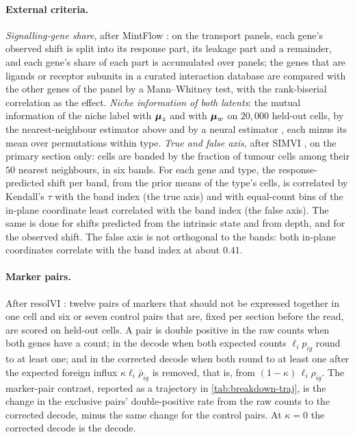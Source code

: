 \paragraph{External criteria.} \emph{Signalling-gene share}, after MintFlow \citep{akbarnejad2025mintflow}: on the transport panels, each gene's observed shift is split into its response part, its leakage part and a remainder, and each gene's share of each part is accumulated over panels; the genes that are ligands or receptor subunits in a curated interaction database \citep{jin2025cellchat} are compared with the other genes of the panel by a Mann--Whitney test, with the rank-biserial correlation as the effect. \emph{Niche information of both latents}: the mutual information of the niche label with $\boldsymbol{\mu}_z$ and with $\boldsymbol{\mu}_w$ on $20{,}000$ held-out cells, by the nearest-neighbour estimator above and by a neural estimator \citep{belghazi2018}, each minus its mean over permutations within type. \emph{True and false axis}, after SIMVI \citep{dong2025simvi}, on the primary section only: cells are banded by the fraction of tumour cells among their $50$ nearest neighbours, in six bands. For each gene and type, the response-predicted shift per band, from the prior means of the type's cells, is correlated by Kendall's $\tau$ with the band index (the true axis) and with equal-count bins of the in-plane coordinate least correlated with the band index (the false axis). The same is done for shifts predicted from the intrinsic state and from depth, and for the observed shift. The false axis is not orthogonal to the bands: both in-plane coordinates correlate with the band index at about $0.41$.

\paragraph{Marker pairs.} After resolVI \citep{ergen2025}: twelve pairs of markers that should not be expressed together in one cell and six or seven control pairs that are, fixed per section before the read, are scored on held-out cells. A pair is double positive in the raw counts when both genes have a count; in the decode when both expected counts $\ell_i p_{ig}$ round to at least one; and in the corrected decode when both round to at least one after the expected foreign influx $\kappa\ell_i\bar\rho_{ig}$ is removed, that is, from $(1-\kappa)\,\ell_i\rho_{ig}$. The marker-pair contrast, reported as a trajectory in \cref{tab:breakdown-traj}, is the change in the exclusive pairs' double-positive rate from the raw counts to the corrected decode, minus the same change for the control pairs. At $\kappa = 0$ the corrected decode is the decode.


